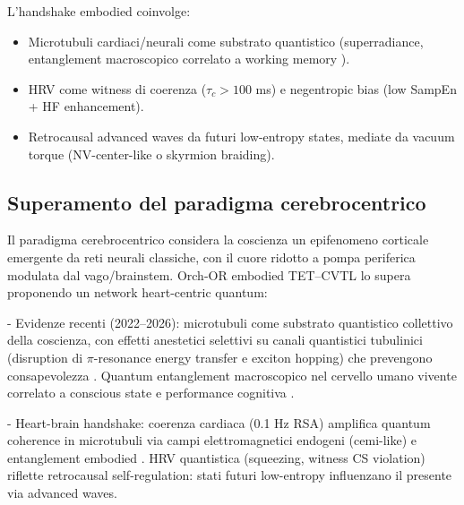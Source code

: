 \documentclass[11pt,a4paper]{article}
\let\oldcite\cite
\renewcommand{\cite}{\protect\oldcite}
\theoremstyle{plain}
\theoremstyle{definition}
\begin{document}
\vspace{0.3cm}

L'handshake embodied coinvolge:
\begin{itemize}
    \item Microtubuli cardiaci/neurali come substrato quantistico (superradiance, entanglement macroscopico correlato a working memory \cite{Wiest2025, CraddockHameroff2015}).
    \item HRV come witness di coerenza ($\tau_c > 100$ ms) e negentropic bias (low SampEn + HF enhancement).
    \item Retrocausal advanced waves da futuri low-entropy states, mediate da vacuum torque (NV-center-like o skyrmion braiding).
\end{itemize}


\vspace{0.5cm}

\subsection{Superamento del paradigma cerebrocentrico}
\label{subsec:superamento-cerebrocentrico}

Il paradigma cerebrocentrico considera la coscienza un epifenomeno corticale emergente da reti neurali classiche, con il cuore ridotto a pompa periferica modulata dal vago/brainstem. Orch-OR embodied TET–CVTL lo supera proponendo un network heart-centric quantum:

\vspace{0.4cm}

- Evidenze recenti (2022--2026): microtubuli come substrato quantistico collettivo della coscienza, con effetti anestetici selettivi su canali quantistici tubulinici (disruption di $\pi$-resonance energy transfer e exciton hopping) che prevengono consapevolezza \cite{Wiest2025, CraddockHameroff2015}. Quantum entanglement macroscopico nel cervello umano vivente correlato a conscious state e performance cognitiva \cite{Fisher2015, Hameroff2022}.

\vspace{0.4cm}

- Heart-brain handshake: coerenza cardiaca (0.1 Hz RSA) amplifica quantum coherence in microtubuli via campi elettromagnetici endogeni (cemi-like) e entanglement embodied \cite{McCraty2017}. HRV quantistica (squeezing, witness CS violation) riflette retrocausal self-regulation: stati futuri low-entropy influenzano il presente via advanced waves.

\vspace{0.4cm}
\end{document}

